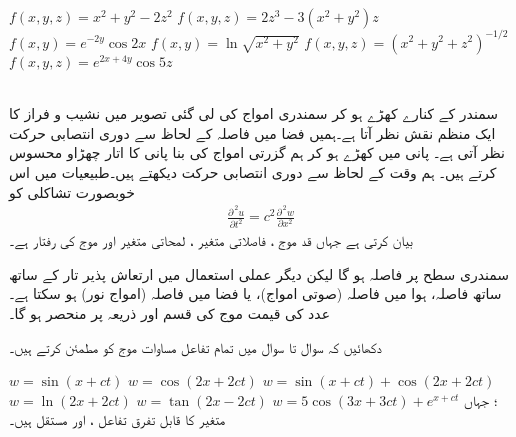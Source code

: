 $f(x,y,z)=x^2+y^2-2z^2$
$f(x,y,z)=2z^3-3(x^2+y^2)z$
$f(x,y)=e^{-2y}\cos 2x$
$f(x,y)=\ln\sqrt{x^2+y^2}$
$f(x,y,z)=(x^2+y^2+z^2)^{-1/2}$
$f(x,y,z)=e^{2x+4y}\cos 5z$

\\
سمندر  کے کنارے کھڑے  ہو کر سمندری امواج کی لی گئی  تصویر  میں نشیب و فراز کا   ایک منظم نقش نظر آتا ہے۔ہمیں  فضا میں  فاصلہ کے لحاظ سے   دوری انتصابی حرکت نظر آتی ہے۔ پانی میں کھڑے ہو کر ہم گزرتی امواج کی بنا پانی کا اتار چھڑاو محسوس کرتے ہیں۔ ہم وقت کے لحاظ سے دوری انتصابی حرکت  دیکھتے ہیں۔طبیعیات  میں اس خوبصورت   تشاکلی کو 
\begin{align}
\frac{\partial^{\,2}u}{\partial t^2}=c^2\frac{\partial ^{\,2}w}{\partial x^2}
\end{align}
بیان کرتی ہے جہاں  قد موج  ، فاصلاتی متغیر  ، لمحاتی متغیر  اور موج کی رفتار    ہے۔ 

سمندری سطح پر فاصلہ  ہو گا لیکن دیگر عملی استعمال میں   ارتعاش پذیر  تار کے ساتھ ساتھ  فاصلہ، ہوا میں فاصلہ (صوتی امواج)، یا فضا میں فاصلہ  (امواج نور)  ہو سکتا ہے۔  عدد  کی قیمت موج کی قسم اور  ذریعہ پر منحصر ہو  گا۔

دکھائیں کہ سوال  تا سوال   میں تمام  تفاعل مساوات موج کو مطمئن کرتے ہیں۔ 

$w=\sin(x+ct)$
$w=\cos(2x+2ct)$
$w=\sin(x+ct)+\cos(2x+2ct)$
$w=\ln(2x+2ct)$
$w=\tan(2x-2ct)$
$w=5\cos(3x+3ct)+e^{x+ct}$
؛ جہاں  متغیر  کا قابل تفرق تفاعل ،   اور   مستقل ہیں۔




